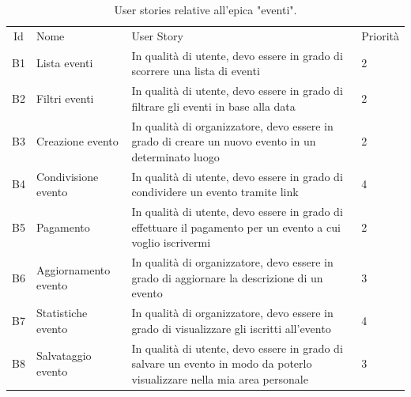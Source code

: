 \documentclass[9pt]{extarticle}
\begin{document}
\begin{table}[!htb]
	\centering
	\renewcommand{\arraystretch}{1.7}
	\begin{tabular}{clp{7cm}l} %
		\toprule
		\rowcolor{gray!20}
		\multicolumn{4}{c}{\textbf{Eventi}}\\ \midrule
		\rowcolor{gray!20}
		Id & Nome & User Story & Priorità \\ \midrule
		B1  & Lista eventi            & In qualità di utente, devo essere in grado di scorrere una lista di eventi                                               &  2\\
		B2  & Filtri eventi           & In qualità di utente, devo essere in grado di filtrare gli eventi in base alla data                                      &  2 \\
		B3  & Creazione evento        & In qualità di organizzatore, devo essere in grado di creare un nuovo evento in un determinato luogo                      &  2 \\
		B4  & Condivisione evento     & In qualità di utente, devo essere in grado di condividere un evento tramite link                                         &  4\\
		B5  & Pagamento               & In qualità di utente, devo essere in grado di effettuare il pagamento per un evento a cui voglio iscrivermi              & 2\\
		B6  & Aggiornamento evento    & In qualità di organizzatore, devo essere in grado di aggiornare la descrizione di un evento                              & 3\\
		B7  & Statistiche evento      & In qualità di organizzatore, devo essere in grado di visualizzare gli iscritti all'evento                                & 4\\
		B8  & Salvataggio evento      & In qualità di utente, devo essere in grado di salvare un evento in modo da poterlo visualizzare nella mia area personale & 3\\
		\bottomrule
	\end{tabular}
	\caption{User stories relative all'epica "eventi".}
	\label{tab:eventi}
\end{table}

\newpage
\end{document}
